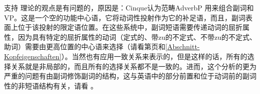 支持 \citet{Cinque99a-u}理论的观点是有问题的，原因是：Cinque认为范畴AdverbP
用来组合副词和VP。这是一个空的功能中心语，它将动词性投射作为它的补足语，而且，副词表面上位于该投射的限定语位置。在这些系统中，副词短语需要传递动词的屈折属性，因为具有特定的屈折属性的动词（定式的、带zu的不定式、不带zu的不定式、助词）需要由更高位置的中心语来选择（请看第\pageref{Beispiel-GPSG-Kopfeigenschaften}页和\ref{Abschnitt-Kopfeigenschaften}）。当然也有应用一致关系来表示的，但是这样的话，所有的选择关系就是非局部的，而且所有的选择关系都不是一致的。进而，这个分析的更为严重的问题有由副词修饰副词的结构，这与英语中的部分前置和位于动词前的副词性的非短语结构有关，请看 。


